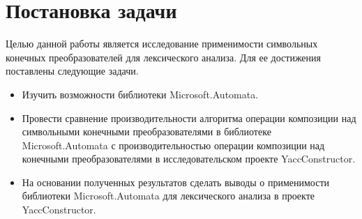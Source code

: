 \section{Постановка задачи}
Целью данной работы является исследование применимости символьных конечных преобразователей для лексического анализа. Для ее достижения поставлены следующие задачи.
\begin{itemize}
    \item Изучить возможности библиотеки Microsoft.Automata.
\item Провести сравнение производительности алгоритма операции композиции над символьными конечными преобразователями в библиотеке Microsoft.Automata с производительностью операции композиции над конечными преобразователями в исследовательском проекте YaccConstructor.
\item На основании полученных результатов сделать выводы о применимости библиотеки Microsoft.Automata для лексического анализа в проекте YaccConstructor.
  \end{itemize}